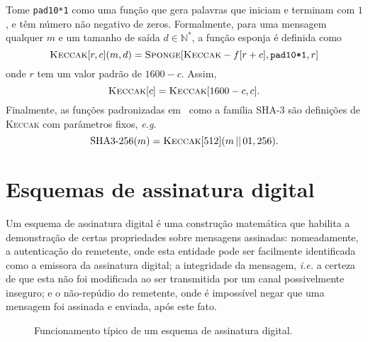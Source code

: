 \documentclass{ufsctex/ufsctex}
\newcommand{\pk}{\mathcal{P}_{k}}
\newcommand{\sk}{\mathcal{S}_{k}}
\newcommand{\concat}{\, \vert{} \vert{} \,}
\newcommand{\binwds}[1]{\{0, 1\}^{#1}}
\begin{document}
Tome \texttt{pad10*1} como uma função que gera palavras que iniciam e terminam
com $1$, e têm número não negativo de zeros. Formalmente, para uma mensagem
qualquer $m$ e um tamanho de saída $d \in \mathbb{N}^{*}$, a função esponja é
definida como
\begin{equation}
  \textsc{Keccak}[r, c](m, d)
    = \textsc{Sponge}[\textsc{Keccak}-f[r + c], \texttt{pad10*1}, r]
\end{equation}
onde $r$ tem um valor padrão de $1600 - c$. Assim,
\begin{equation}
  \textsc{Keccak}[c] = \textsc{Keccak}[1600 - c, c].
\end{equation}
Finalmente, as funções padronizadas em~\cite{Dworkin:report:2015:jul} como a
família SHA-3 são definições de \textsc{Keccak} com parâmetros fixos,
\emph{e.g.}
\begin{equation}
  \text{SHA3-}256(m) = \textsc{Keccak}[512](m \concat 01, 256).
\end{equation}\simbolo{$\concat$}{Concatenação de palavras}

\section{Esquemas de assinatura digital}\label{section:digitalsig}

Um esquema de assinatura digital é uma construção matemática que habilita a
demonstração de certas propriedades sobre mensagens assinadas: nomeadamente, a
autenticação do remetente, onde esta entidade pode ser facilmente identificada
como a emissora da assinatura digital; a integridade da mensagem, \emph{i.e.} a
certeza de que esta não foi modificada ao ser transmitida por um canal
possivelmente inseguro; e o não-repúdio do remetente, onde é impossível negar
que uma mensagem foi assinada e enviada, após este fato.

\begin{figure}
  \centering
  \caption{Funcionamento típico de um
    esquema de assinatura digital.}\label{fig:sign}
\end{figure}
\end{document}
